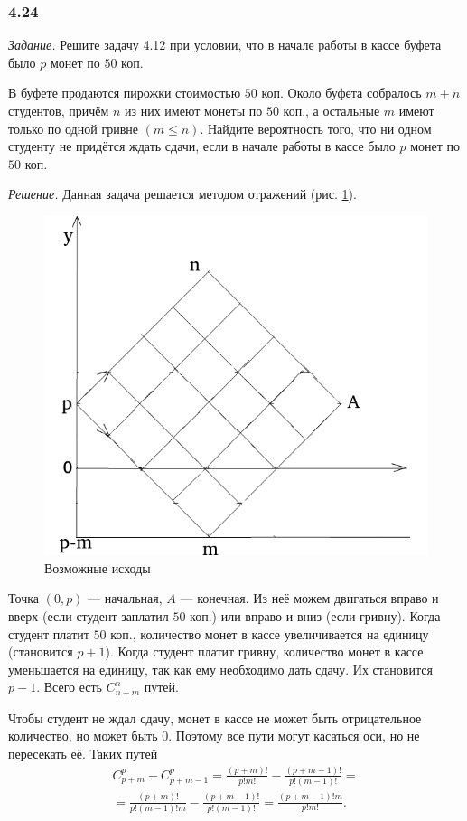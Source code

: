 \subsubsection*{4.24}

\textit{Задание.} Решите задачу 4.12 при условии, что в начале работы в кассе буфета было $p$ монет по $50$ коп.

В буфете продаются пирожки стоимостью $50$ коп.
Около буфета собралось $m+n$ студентов,
причём $n$ из них имеют монеты по $50$ коп., а остальные $m$ имеют только по одной гривне $ \left( m \leq n \right) $.
Найдите вероятность того, что ни одном студенту не придётся ждать сдачи,
если в начале работы в кассе было $p$ монет по $50$ коп. 

\textit{Решение.} Данная задача решается методом отражений (рис. \ref{fig:423}).

\begin{figure}[h!]
  \centering
  \includegraphics[width=.6\textwidth]{./pictures/4_23.png}
  \caption{Возможные исходы}
  \label{fig:423}
\end{figure}

Точка $ \left( 0, p \right) $ --- начальная, $A$ --- конечная.
Из неё можем двигаться вправо и вверх (если студент заплатил $50$ коп.) или вправо и вниз (если гривну).
Когда студент платит $50$ коп., количество монет в кассе увеличивается на единицу (становится $p + 1$).
Когда студент платит гривну, количество монет в кассе уменьшается на единицу, так как ему необходимо дать сдачу.
Их становится $p - 1$.
Всего есть $C_{n+m}^n$ путей.

Чтобы студент не ждал сдачу, монет в кассе не может быть отрицательное количество, но может быть 0.
Поэтому все пути могут касаться оси, но не пересекать её.
Таких путей 
\begin{equation*}
\begin{split}
C_{p+m}^p - C_{p+m-1}^p =
\frac{ \left( p+m \right)!}{p!m!} - \frac{ \left( p+m-1 \right)!}{p! \left( m-1 \right)!} = \\
= \frac{ \left( p+m \right)!}{p! \left( m-1 \right)! m} - \frac{ \left( p+m-1 \right)!}{p! \left( m-1 \right)!} =
\frac{ \left( p+m-1 \right)!m}{p!m!}.
\end{split}
\end{equation*}
